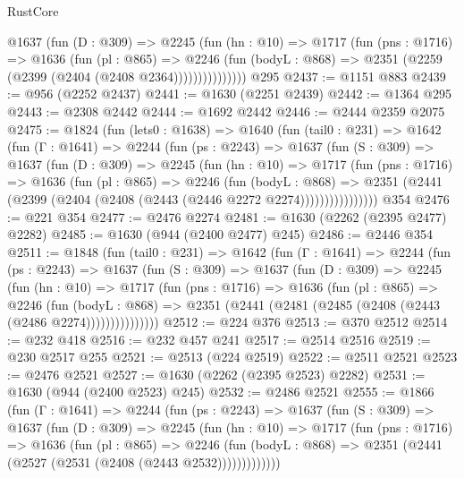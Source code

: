 \begin{lexlean}{RustCore}
\begin{coremodule}
              @1637
                (fun (D : @309) =>
                @2245
                  (fun (hn : @10) =>
                  @1717
                    (fun (pns : @1716) =>
                    @1636
                      (fun (pl : @865) =>
                      @2246
                        (fun (bodyL : @868) =>
                        @2351 (@2259 (@2399 (@2404 (@2408 @2364)))))))))))))))
    @295
@2437 := @1151 @883
@2439 := @956 (@2252 @2437)
@2441 := @1630 (@2251 @2439)
@2442 := @1364 @295
@2443 := @2308 @2442
@2444 := @1692 @2442
@2446 := @2444 @2359 @2075
@2475 := @1824
    (fun (lets0 : @1638) =>
    @1640
      (fun (tail0 : @231) =>
      @1642
        (fun (Γ : @1641) =>
        @2244
          (fun (ps : @2243) =>
          @1637
            (fun (S : @309) =>
            @1637
              (fun (D : @309) =>
              @2245
                (fun (hn : @10) =>
                @1717
                  (fun (pns : @1716) =>
                  @1636
                    (fun (pl : @865) =>
                    @2246
                      (fun (bodyL : @868) =>
                      @2351 (@2441 (@2399 (@2404 (@2408 (@2443 (@2446 @2272 @2274))))))))))))))))
    @354
@2476 := @221 @354
@2477 := @2476 @2274
@2481 := @1630 (@2262 (@2395 @2477) @2282)
@2485 := @1630 (@944 (@2400 @2477) @245)
@2486 := @2446 @354
@2511 := @1848
    (fun (tail0 : @231) =>
    @1642
      (fun (Γ : @1641) =>
      @2244
        (fun (ps : @2243) =>
        @1637
          (fun (S : @309) =>
          @1637
            (fun (D : @309) =>
            @2245
              (fun (hn : @10) =>
              @1717
                (fun (pns : @1716) =>
                @1636
                  (fun (pl : @865) =>
                  @2246
                    (fun (bodyL : @868) =>
                    @2351 (@2441 (@2481 (@2485 (@2408 (@2443 (@2486 @2274)))))))))))))))
@2512 := @224 @376
@2513 := @370 @2512
@2514 := @232 @418
@2516 := @232 @457 @241
@2517 := @2514 @2516
@2519 := @230 @2517 @255
@2521 := @2513 (@224 @2519)
@2522 := @2511 @2521
@2523 := @2476 @2521
@2527 := @1630 (@2262 (@2395 @2523) @2282)
@2531 := @1630 (@944 (@2400 @2523) @245)
@2532 := @2486 @2521
@2555 := @1866
    (fun (Γ : @1641) =>
    @2244
      (fun (ps : @2243) =>
      @1637
        (fun (S : @309) =>
        @1637
          (fun (D : @309) =>
          @2245
            (fun (hn : @10) =>
            @1717
              (fun (pns : @1716) =>
              @1636
                (fun (pl : @865) =>
                @2246
                  (fun (bodyL : @868) => @2351 (@2441 (@2527 (@2531 (@2408 (@2443 @2532)))))))))))))

\end{coremodule}
\end{lexlean}
